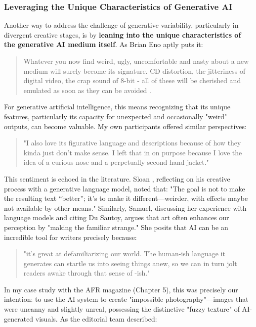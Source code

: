 \subsubsection{Leveraging the Unique Characteristics of Generative AI}

Another way to address the challenge of generative variability, particularly in divergent creative stages, is by \textbf{leaning into the unique characteristics of the generative AI medium itself}. As Brian Eno aptly puts it:

\begin{quote}
    Whatever you now find weird, ugly, uncomfortable and nasty about a new medium will surely become its signature. CD distortion, the jitteriness of digital video, the crap sound of 8-bit - all of these will be cherished and emulated as soon as they can be avoided \cite{Eno2007-fl}.
\end{quote}

For generative artificial intelligence, this means recognizing that its unique features, particularly its capacity for unexpected and occasionally "weird" outputs, can become valuable. My own participants offered similar perspectives:

\begin{quote}
"I also love its figurative language and descriptions because of how they kinda just don't make sense. I left that in on purpose because I love the idea of a curious nose and a perpetually second-hand jacket."
\end{quote}

This sentiment is echoed in the literature. Sloan \cite{Sloan2016-fj}, reflecting on his creative process with a generative language model, noted that: "The goal is not to make the resulting text “better”; it’s to make it different—weirder, with effects maybe not available by other means." Similarly, Samuel, discussing her experience with language models and citing Du Sautoy, argues that art often enhances our perception by "making the familiar strange." She posits that AI can be an incredible tool for writers precisely because:

\begin{quote}
"it’s great at defamiliarizing our world. The human-ish language it generates can startle us into seeing things anew, so we can in turn jolt readers awake through that sense of -ish."
\end{quote}

In my case study with the AFR magazine (Chapter 5), this was precisely our intention: to use the AI system to create "impossible photography"—images that were uncanny and slightly unreal, possessing the distinctive "fuzzy texture" of AI-generated visuals. As the editorial team described:

